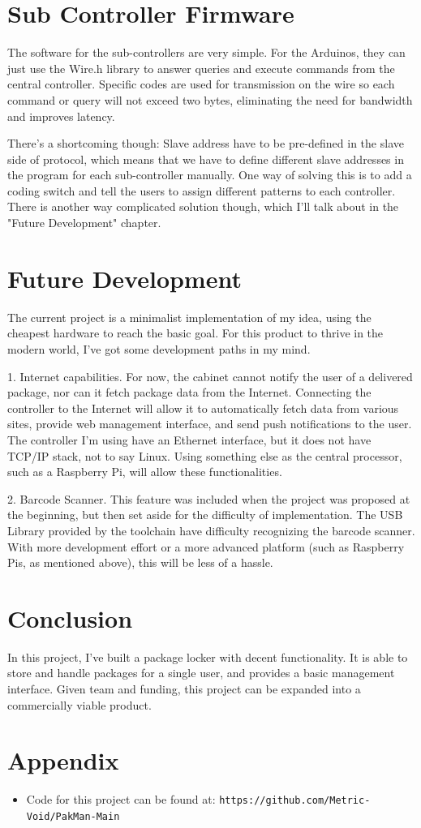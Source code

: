 \documentclass{article}
\begin{document}
\section{Sub Controller Firmware}
\par The software for the sub-controllers are very simple. For the Arduinos, they can just use the Wire.h library to answer queries and execute commands from the central controller. Specific codes are used for transmission on the wire so each command or query will not exceed two bytes, eliminating the need for bandwidth and improves latency.
\par There's a shortcoming though: Slave address have to be pre-defined in the slave side of protocol, which means that we have to define different slave addresses in the program for each sub-controller manually. One way of solving this is to add a coding switch and tell the users to assign different patterns to each controller. There is another way complicated solution though, which I'll talk about in the "Future Development" chapter.
\section{Future Development}
\par The current project is a minimalist implementation of my idea, using the cheapest hardware to reach the basic goal. For this product to thrive in the modern world, I've got some development paths in my mind.
\par 1. Internet capabilities. For now, the cabinet cannot notify the user of a delivered package, nor can it fetch package data from the Internet. Connecting the controller to the Internet will allow it to automatically fetch data from various sites, provide web management interface, and send push notifications to the user. The controller I'm using have an Ethernet interface, but it does not have TCP/IP stack, not to say Linux. Using something else as the central processor, such as a Raspberry Pi, will allow these functionalities.
\par 2. Barcode Scanner. This feature was included when the project was proposed at the beginning, but then set aside for the difficulty of implementation. The USB Library provided by the toolchain have difficulty recognizing the barcode scanner. With more development effort or a more advanced platform (such as Raspberry Pis, as mentioned above), this will be less of a hassle.
\section{Conclusion}
\par In this project, I've built a package locker with decent functionality. It is able to store and handle packages for a single user, and provides a basic management interface. Given team and funding, this project can be expanded into a commercially viable product.
\section{Appendix}
\begin{itemize}
\item Code for this project can be found at: \texttt{https://github.com/Metric-Void/PakMan-Main}
\end{itemize}
\end{document}
